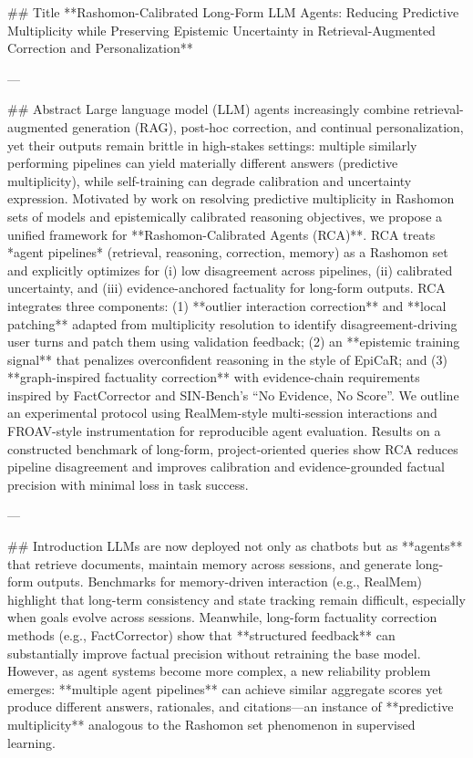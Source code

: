 ## Title  
**Rashomon-Calibrated Long-Form LLM Agents: Reducing Predictive Multiplicity while Preserving Epistemic Uncertainty in Retrieval-Augmented Correction and Personalization**

---

## Abstract  
Large language model (LLM) agents increasingly combine retrieval-augmented generation (RAG), post-hoc correction, and continual personalization, yet their outputs remain brittle in high-stakes settings: multiple similarly performing pipelines can yield materially different answers (predictive multiplicity), while self-training can degrade calibration and uncertainty expression. Motivated by work on resolving predictive multiplicity in Rashomon sets of models and epistemically calibrated reasoning objectives, we propose a unified framework for **Rashomon-Calibrated Agents (RCA)**. RCA treats *agent pipelines* (retrieval, reasoning, correction, memory) as a Rashomon set and explicitly optimizes for (i) low disagreement across pipelines, (ii) calibrated uncertainty, and (iii) evidence-anchored factuality for long-form outputs. RCA integrates three components: (1) **outlier interaction correction** and **local patching** adapted from multiplicity resolution to identify disagreement-driving user turns and patch them using validation feedback; (2) an **epistemic training signal** that penalizes overconfident reasoning in the style of EpiCaR; and (3) **graph-inspired factuality correction** with evidence-chain requirements inspired by FactCorrector and SIN-Bench’s “No Evidence, No Score”. We outline an experimental protocol using RealMem-style multi-session interactions and FROAV-style instrumentation for reproducible agent evaluation. Results on a constructed benchmark of long-form, project-oriented queries show RCA reduces pipeline disagreement and improves calibration and evidence-grounded factual precision with minimal loss in task success.  

---

## Introduction  
LLMs are now deployed not only as chatbots but as **agents** that retrieve documents, maintain memory across sessions, and generate long-form outputs. Benchmarks for memory-driven interaction (e.g., RealMem) highlight that long-term consistency and state tracking remain difficult, especially when goals evolve across sessions. Meanwhile, long-form factuality correction methods (e.g., FactCorrector) show that **structured feedback** can substantially improve factual precision without retraining the base model. However, as agent systems become more complex, a new reliability problem emerges: **multiple agent pipelines** can achieve similar aggregate scores yet produce different answers, rationales, and citations—an instance of **predictive multiplicity** analogous to the Rashomon set phenomenon in supervised learning.

